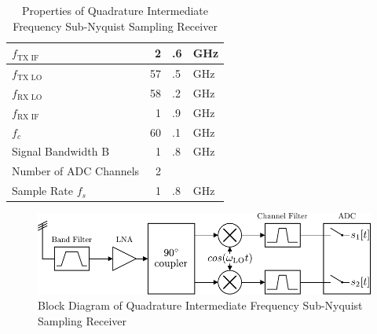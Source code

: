 \begin{table}[h]
  \centering
  \begin{tabular}{|l|r@{}l@{~}l|}
    \hline
    $f_{\text{TX IF}}$ & 2&.6&GHz \\ \hline
    $f_{\text{TX LO}}$ & 57&.5&GHz \\ \hline
    $f_{\text{RX LO}}$ & 58&.2&GHz \\ \hline
    $f_{\text{RX IF}}$ & 1&.9&GHz \\ \hline
    $f_c$            & 60&.1&GHz \\ \hline
    Signal Bandwidth B & 1&.8&GHz \\ \hline
    Number of \gls{ADC} Channels & 2&& \\ \hline
    Sample Rate $f_s$ & 1&.8&GHz \\ \hline
  \end{tabular}
  \caption{Properties of Quadrature Intermediate Frequency
    Sub-Nyquist Sampling Receiver}
  \label{tab:rx_2}
\end{table}

\begin{figure}[p]
  \centering
  \includegraphics[width=\textwidth]{figures/quad_if_rx_block_diagram}
  \caption{Block Diagram of Quadrature Intermediate Frequency Sub-Nyquist Sampling Receiver}
  \label{fig:rx_2_bd}
\end{figure}

